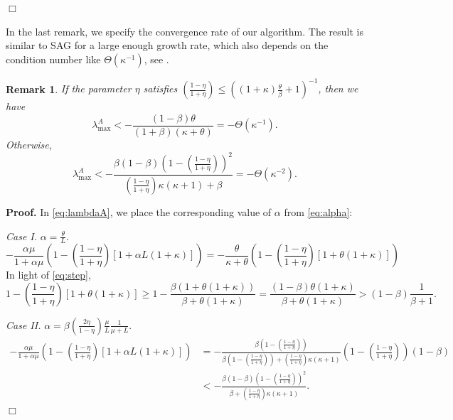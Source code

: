 \documentclass[11pt]{article}
\newtheorem{rem}[thm]{Remark}
\begin{document}
  \hspace*{\fill}$\Box$\medskip

In the last remark, we specify the convergence rate of our algorithm. The result is similar to SAG for a large enough growth rate, which also depends on the condition number like $\Theta(\kappa^{-1})$, see \cite{roux2012stochastic}.

\begin{rem}\label{lemma:order}
If the parameter $\eta$ satisfies $(\frac{1-\eta}{1+\eta}) \leq \left((1+\kappa)\frac{\theta}{\beta} + 1\right)^{-1}$, then we have 
\begin{equation}\label{eq:rate1}
\lambda_{\max}^A < -\frac{(1-\beta)\theta}{(1+\beta)(\kappa+\theta)} = -\Theta(\kappa^{-1}).   
\end{equation}
Otherwise, 
\begin{equation}\label{eq:rate2}
 \lambda_{\max}^A < -\frac{\beta(1-\beta)(1-(\frac{1-\eta}{1+\eta}))^2}{(\frac{1-\eta}{1+\eta})\kappa(\kappa+1)+\beta} = -\Theta(\kappa^{-2}).
\end{equation}
\end{rem}

\noindent 
\textbf{Proof.} In \eqref{eq:lambdaA}, we place the corresponding value of $\alpha$ from \eqref{eq:alpha}:

\bigskip

\textit{Case I.} $\alpha=\displaystyle\frac{\theta}{L}$. 
\[
 -\frac{\alpha\mu}{1+\alpha\mu}\left(1-(\frac{1-\eta}{1+\eta})[1+\alpha L(1+\kappa)]\right) = -\frac{\theta}{\kappa+\theta}\left(1-(\frac{1-\eta}{1+\eta})[1+\theta(1+\kappa)]\right)
\]
In light of \eqref{eq:step}, 
\[
 1-(\frac{1-\eta}{1+\eta})[1+\theta(1+\kappa)]\geq 1-\frac{\beta(1+\theta(1+\kappa))}{\beta+\theta(1+\kappa)} = \frac{(1-\beta)\theta(1+\kappa)}{\beta+\theta(1+\kappa)}> (1-\beta)\frac{1}{\beta+1}.
\]

\bigskip

\textit{Case II.} $\alpha = \displaystyle\beta\left(\frac{2 \eta}{1-\eta} \right)\frac{\mu}{L}\frac{1}{\mu+L}$.
\begin{align*}
 -\frac{\alpha\mu}{1+\alpha\mu}\left(1-(\frac{1-\eta}{1+\eta})[1+\alpha L(1+\kappa)]\right) &= -\frac{\beta(1-(\frac{1-\eta}{1+\eta}))}{\beta(1-(\frac{1-\eta}{1+\eta}))+(\frac{1-\eta}{1+\eta})\kappa(\kappa+1)}(1-(\frac{1-\eta}{1+\eta}))(1-\beta)\\
 & < -\frac{\beta(1-\beta)(1-(\frac{1-\eta}{1+\eta}))^2}{\beta+(\frac{1-\eta}{1+\eta})\kappa(\kappa+1)}.
\end{align*}
\hspace*{\fill}$\Box$\medskip
\end{document}
